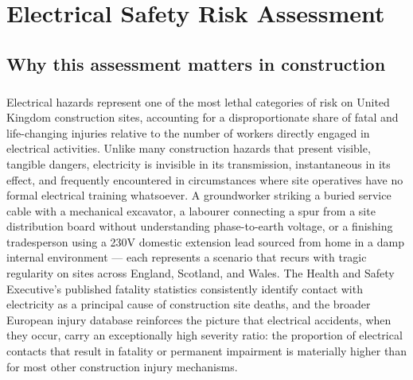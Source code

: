 \chapter{Electrical Safety Risk Assessment}
\label{chap:Electrical Safety Risk Assessment}

\section{Why this assessment matters in construction}

\paragraph{}
Electrical hazards represent one of the most lethal categories of risk on United Kingdom construction sites, accounting for a disproportionate share of fatal and life-changing injuries relative to the number of workers directly engaged in electrical activities. Unlike many construction hazards that present visible, tangible dangers, electricity is invisible in its transmission, instantaneous in its effect, and frequently encountered in circumstances where site operatives have no formal electrical training whatsoever. A groundworker striking a buried service cable with a mechanical excavator, a labourer connecting a spur from a site distribution board without understanding phase-to-earth voltage, or a finishing tradesperson using a 230V domestic extension lead sourced from home in a damp internal environment --- each represents a scenario that recurs with tragic regularity on sites across England, Scotland, and Wales. The Health and Safety Executive's published fatality statistics consistently identify contact with electricity as a principal cause of construction site deaths, and the broader European injury database reinforces the picture that electrical accidents, when they occur, carry an exceptionally high severity ratio: the proportion of electrical contacts that result in fatality or permanent impairment is materially higher than for most other construction injury mechanisms.

